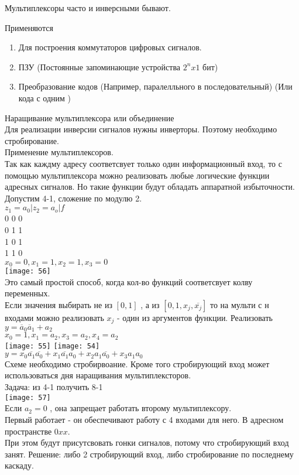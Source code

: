 Мультиплексоры часто и инверсными бывают.

Применяются\\
\begin{enumerate}
  \item Для построения коммутаторов цифровых сигналов.
  \item ПЗУ (Постоянные запоминающие устройства $ 2^n x 1 $ бит)
  \item Преобразование кодов (Например, паралелльного в последовательный) (Или кода с одним )
\end{enumerate}


Наращивание  мультиплексора или объединение\\
Для реализации инверсии сигналов нужны инверторы. Поэтому необходимо стробирование.\\

Применение мультиплексоров.\\
Так как каждму адресу соответсвует только один информационный вход,
то с помощью мультиплексора можно реализовать любые логические функции адресных сигналов.
Но такие функции будут обладать аппаратной избыточности.
Допустим 4-1, сложение по модулю 2.\\
$z_1=a_0 |z_2 =a_o | f$\\
0 0 0\\
0 1 1\\
1 0 1\\
1 1 0\\
$x_0 = 0 , x_1 = 1, x_2 = 1, x_3 = 0$\\
\texttt{[image: 56]}\\
Это самый простой способ, когда кол-во функций соответсвует колву переменных.\\
Если значения выбирать не из $[0,1]$ , а из $[0,1,x_j,  \overline{x_j}]$ то на мульти с н входами можно реализовать
$x_j$ - один из аргументов функции.
Реализовать\\
$y = \overline{a}_0 \overline{a}_1 + a_2$\\
$x_0 = 1, x_1 = a_2, x_3= a_2,x_4= a_2$\\
\texttt{[image: 55]}
\texttt{[image: 54]}\\

$y = x_0 \overline{a_1}\overline{a_0} + x_1 \overline{a_1} a_0 + x_2 a_1 \overline{a_0} + x_3 a_1 a_0$\\

Схеме необходимо стробирвоание. Кроме того стробирующий вход может использоваться дня наращивания мультиплексторов.\\
Задача: из 4-1 получить 8-1\\
\texttt{[image: 57]}\\


Если $a_2 = 0$ , она запрещает работать второму мультиплексору.\\
Первый работает - он обеспечивают работу с 4 входами для него. В адресном пространстве $0xx$. \\
При этом будут присутсвовать гонки сигналов, потому что стробирующий вход занят.
Решение: либо 2 стробирующий вход, либо стробирование по последнему каскаду.
